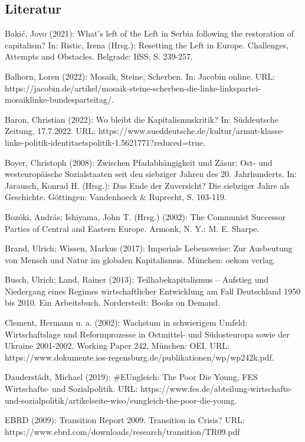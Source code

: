 \begin{multicols*}{2}
\section{Literatur}
    \begin{bibdescription}
        \item Bakić, Jovo (2021): What’s left of the Left in Serbia following the restoration of capitalism? In: Ristic, Irena (Hrsg.): Resetting the Left in Europe. Challenges, Attempts and Obstacles. Belgrade: IfSS, S. 239-257.
        \item Balhorn, Loren (2022): Mosaik, Steine, Scherben. In: Jacobin online. URL: https://jacobin.de/artikel/mosaik-steine-scherben-die-linke-linkspartei-mosaiklinke-bundesparteitag/.
        \item Baron, Christian (2022): Wo bleibt die Kapitalismuskritik? In: Süddeutsche Zeitung, 17.7.2022. URL: https://www.sueddeutsche.de/kultur/armut-klasse-linke-politik-identitaetspolitik-1.5621771?reduced=true.
        \item Boyer, Christoph (2008): Zwischen Pfadabhängigkeit und Zäsur: Ost- und westeuropäische Sozialstaaten seit den siebziger Jahren des 20. Jahrhunderts. In: Jarausch, Konrad H. (Hrsg.): Das Ende der Zuversicht? Die siebziger Jahre als Geschichte. Göttingen: Vandenhoeck \& Ruprecht, S. 103-119.
        \item Bozóki, András; Ishiyama, John T. (Hrsg.) (2002): The Communist Successor Parties of Central and Eastern Europe. Armonk, N. Y.: M. E. Sharpe.
        \item Brand, Ulrich; Wissen, Markus (2017): Imperiale Lebensweise: Zur Ausbeutung von Mensch und Natur im globalen Kapitalismus. München: oekom verlag.
        \item Busch, Ulrich; Land, Rainer (2013): Teilhabekapitalismus – Aufstieg und Niedergang eines Regimes wirtschaftlicher Entwicklung am Fall Deutschland 1950 bis 2010. Ein Arbeitsbuch. Norderstedt: Books on Demand.
        \item Clement, Hermann u. a. (2002): Wachstum in schwierigem Umfeld: Wirtschaftslage und Reformprozesse in Ostmittel- und Südosteuropa sowie der Ukraine 2001-2002. Working Paper 242, München: OEI. URL: https://www.dokumente.ios-regensburg.de/publikationen/wp/wp242k.pdf. 
        \item Dauderstädt, Michael (2019): \#EUngleich: The Poor Die Young, FES Wirtschafts- und Sozialpolitik. URL: https://www.fes.de/abteilung-wirtschafts-und-sozialpolitik/artikelseite-wiso/eungleich-the-poor-die-young.
        \item EBRD (2009): Transition Report 2009. Transition in Crisis? URL: https://www.ebrd.com/downloads/research/transition/TR09.pdf 

\end{bibdescription}
\end{multicols*}
